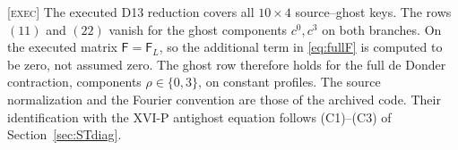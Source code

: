 
\begin{remark}
\label{rem:transtrace}
\textsc{[exec]} The executed D13 reduction covers all \(10\times4\)
source--ghost keys.
The rows \((11)\) and \((22)\) vanish for the ghost components
\(c^0,c^3\) on both branches.
On the executed matrix \(\mathsf F=\mathsf F_L\), so the additional
term in \eqref{eq:fullF} is computed to be zero, not assumed zero.
The ghost row therefore holds for the full de Donder contraction,
components \(\rho\in\{0,3\}\), on constant profiles.
The source normalization and the Fourier convention are those of
the archived code. Their identification with the XVI-P antighost
equation follows (C1)--(C3) of Section~\ref{sec:STdiag}.
\end{remark}
